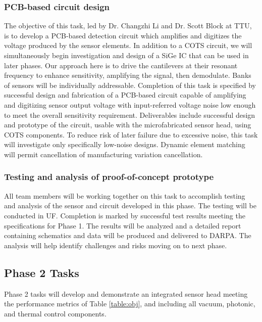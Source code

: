 \subsubsection{PCB-based circuit design}\label{sec:p1:cir}

The objective of this task, led by Dr. Changzhi Li and Dr. Scott Block at TTU, is to develop a PCB-based detection circuit which amplifies and digitizes the voltage produced by the sensor elements. In addition to a COTS circuit, we will simultaneously begin investigation and design of a SiGe IC that can be used in later phases. Our approach here is to drive the cantilevers at their resonant frequency to enhance sensitivity, amplifying the signal, then demodulate. Banks of sensors will be individually addressable. Completion of this task is specified by successful design and fabrication of a PCB-based circuit capable of amplifying and digitizing sensor output voltage with input-referred voltage noise low enough to meet the overall sensitivity requirement. Deliverables include successful design and prototype of the circuit, usable with the microfabricated sensor head, using COTS components. To reduce risk of later failure due to excessive noise, this task will investigate only specifically low-noise designs. Dynamic element matching will permit cancellation of manufacturing variation cancellation.


\subsubsection{Testing and analysis of proof-of-concept prototype}

All team members will be working together on this task to accomplish testing and analysis of the sensor and circuit developed in this phase. The testing will be conducted in UF. Completion is marked by successful test results meeting the specifications for Phase 1. The results will be analyzed and a detailed report containing schematics and data will be produced and delivered to DARPA. The analysis will help identify challenges and risks moving on to next phase.

\subsection{Phase 2 Tasks}
  
Phase 2 tasks will develop and demonstrate an integrated sensor head meeting the performance metrics of Table \ref{table:obj}, and including all vacuum, photonic, and thermal control components.

